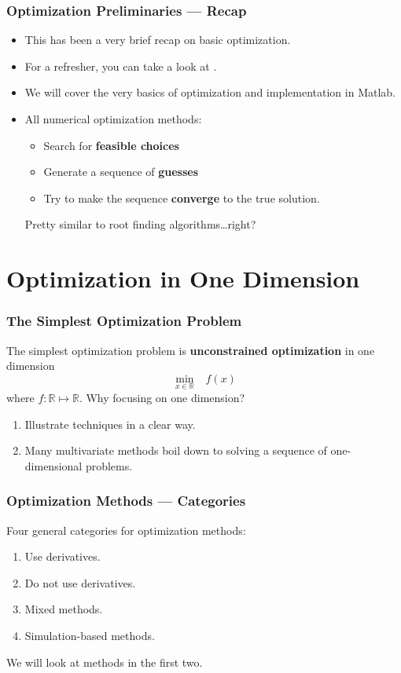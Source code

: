 \documentclass[11pt,xcolor={svgnames},aspectratio=169,usepdftitle=false]{beamer}
\begin{document}
\begin{frame}
  \frametitle{Optimization Preliminaries --- Recap}
\begin{itemize}
  \item This has been a very brief recap on basic optimization.
  \item For a refresher, you can take a look at \cite[Chapters~17-19]{simon1994mathematics}.
  \item We will cover the very basics of optimization and implementation in Matlab.
  \item All numerical optimization methods:
  \begin{itemize}
    \item Search for \alert{\textbf{feasible choices}}
    \item Generate a sequence of \alert{\textbf{guesses}}
    \item Try to make the sequence \alert{\textbf{converge}} to the true solution.
  \end{itemize}
  {\tiny Pretty similar to root finding algorithms\ldots right?}
\end{itemize}
\end{frame}

\section{Optimization in One Dimension}

\begin{frame}
  \frametitle{The Simplest Optimization Problem}

The simplest optimization problem is \alert{\textbf{unconstrained optimization}} in one dimension
\[
\underset{x\in\mathbb{R}}{\min} \phantom{\Omega} f(x)
\]
where $f : \mathbb{R}\mapsto\mathbb{R}$.
Why focusing on one dimension?
\begin{enumerate}
  \item Illustrate techniques in a clear way.
  \item Many multivariate methods boil down to solving a sequence of one-dimensional problems.
\end{enumerate}
\end{frame}

\begin{frame}
  \frametitle{Optimization Methods --- Categories}
Four general categories for optimization methods:
\begin{enumerate}
  \item Use derivatives.
  \item Do not use derivatives.
  \item Mixed methods.
  \item Simulation-based methods.
\end{enumerate}

We will look at methods in the first two.
\end{frame}
\end{document}
